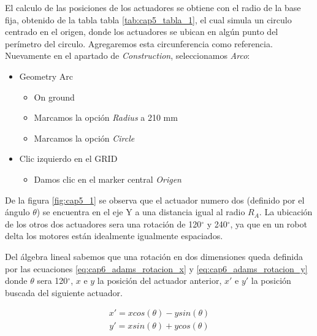         
        El calculo de las posiciones de los actuadores se obtiene con el radio de la base fija, obtenido de la tabla tabla \eqref{tab:cap5_tabla_1}, el cual simula un circulo centrado en el origen, donde los actuadores se ubican en algún punto del perímetro del circulo. Agregaremos esta circunferencia como referencia. Nuevamente en el apartado de \textit{Construction}, seleccionamos \textit{Arco}:
        
        \begin{scope}
            \renewcommand{\labelitemi}{\blacklozenge}
            \renewcommand{\labelitemii}{\checkmark}
            \begin{itemize}
                \item Geometry Arc
                \begin{itemize}
                    \item On ground
                    \item Marcamos la opción \textit{Radius} a 210 mm
                    \item Marcamos la opción \textit{Circle}
                \end{itemize}
                \item Clic izquierdo en el GRID
                \begin{itemize}
                    \item Damos clic en el marker central \textit{Origen}
                \end{itemize}
            \end{itemize}
        \end{scope}
        
        
        De la figura \eqref{fig:cap5_1} se observa que el actuador numero dos (definido por el ángulo $\theta$) se encuentra en el eje Y a una distancia igual al radio $R_{A}$. La ubicación de los otros dos actuadores sera una rotación de 120$^{\circ}$ y 240$^{\circ}$, ya que en un robot delta los motores están idealmente igualmente espaciados.
        
        Del álgebra lineal sabemos que una rotación en dos dimensiones queda definida por las ecuaciones \eqref{eq:cap6_adams_rotacion_x} y \eqref{eq:cap6_adams_rotacion_y} donde $\theta$ sera 120$^{\circ}$, $x$ e $y$ la posición del actuador anterior, $x'$ e $y'$ la posición buscada del siguiente actuador.
        
        \begin{align} 
            x'= xcos(\theta) - ysin(\theta) 
            \label{eq:cap6_adams_rotacion_x}
        \end{align}
        \begin{align} 
            y'= xsin(\theta) + ycos(\theta)
            \label{eq:cap6_adams_rotacion_y}
        \end{align}
        
